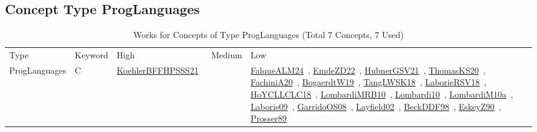 \clearpage
\subsection{Concept Type ProgLanguages}
\label{sec:ProgLanguages}
\label{ProgLanguages}
{\scriptsize
\begin{longtable}{lp{3cm}>{\raggedright\arraybackslash}p{6cm}>{\raggedright\arraybackslash}p{6cm}>{\raggedright\arraybackslash}p{8cm}}
\rowcolor{white}\caption{Works for Concepts of Type ProgLanguages (Total 7 Concepts, 7 Used)}\\ \toprule
\rowcolor{white}Type & Keyword & High & Medium & Low\\ \midrule\endhead
\bottomrule
\endfoot
\index{C }\index{ProgLanguages!C }ProgLanguages & C  & \href{../works/KoehlerBFFHPSSS21.pdf}{KoehlerBFFHPSSS21}~\cite{KoehlerBFFHPSSS21} &  & \href{../works/FalqueALM24.pdf}{FalqueALM24}~\cite{FalqueALM24}, \href{../works/EmdeZD22.pdf}{EmdeZD22}~\cite{EmdeZD22}, \href{../works/HubnerGSV21.pdf}{HubnerGSV21}~\cite{HubnerGSV21}, \href{../works/ThomasKS20.pdf}{ThomasKS20}~\cite{ThomasKS20}, \href{../works/FachiniA20.pdf}{FachiniA20}~\cite{FachiniA20}, \href{../works/BogaerdtW19.pdf}{BogaerdtW19}~\cite{BogaerdtW19}, \href{../works/TangLWSK18.pdf}{TangLWSK18}~\cite{TangLWSK18}, \href{../works/LaborieRSV18.pdf}{LaborieRSV18}~\cite{LaborieRSV18}, \href{../works/HoYCLLCLC18.pdf}{HoYCLLCLC18}~\cite{HoYCLLCLC18}, \href{../works/LombardiMRB10.pdf}{LombardiMRB10}~\cite{LombardiMRB10}, \href{../works/Lombardi10.pdf}{Lombardi10}~\cite{Lombardi10}, \href{../works/LombardiM10a.pdf}{LombardiM10a}~\cite{LombardiM10a}, \href{../works/Laborie09.pdf}{Laborie09}~\cite{Laborie09}, \href{../works/GarridoOS08.pdf}{GarridoOS08}~\cite{GarridoOS08}, \href{../works/Layfield02.pdf}{Layfield02}~\cite{Layfield02}, \href{../works/BeckDDF98.pdf}{BeckDDF98}~\cite{BeckDDF98}, \href{../works/EskeyZ90.pdf}{EskeyZ90}~\cite{EskeyZ90}, \href{../works/Prosser89.pdf}{Prosser89}~\cite{Prosser89}\\

\end{longtable}}
